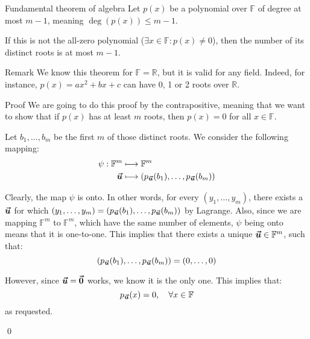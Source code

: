\documentclass[a4paper]{article}
\begin{document}
\begin{parag}{Fundamental theorem of algebra}
    Let $p\left(x\right)$ be a polynomial over $\mathbb{F}$ of degree at most $m-1$, meaning $\deg\left(p\left(x\right)\right) \leq m -1$.

    If this is not the all-zero polynomial ($\exists x \in \mathbb{F} : p\left(x\right) \neq 0$), then the number of its distinct roots is at most $m - 1$. 

    \begin{subparag}{Remark}
        We know this theorem for $\mathbb{F} = \mathbb{R}$, but it is valid for any field. Indeed, for instance, $p\left(x\right) = ax^2 + bx + c$ can have 0, 1 or 2 roots over $\mathbb{R}$.
    \end{subparag}

    \begin{subparag}{Proof}
        We are going to do this proof by the contrapositive, meaning that we want to show that if $p\left(x\right)$ has at least $m$ roots, then $p\left(x\right) = 0$ for all $x \in \mathbb{F}$.

        Let $b_1, \ldots, b_m$ be the first $m$ of those distinct roots. We consider the following mapping:
        \[\begin{split}
        \psi: \mathbb{F}^m &\longmapsto \mathbb{F}^m \\
        \bvec{u} &\longmapsto \left(p_{\bvec{u}}\left(b_1\right), \ldots, p_{\bvec{u}}\left(b_m\right)\right)
        \end{split}\]
        
        Clearly, the map $\psi$ is onto. In other words, for every $\left(y_1, \ldots, y_m\right)$, there exists a $\bm{\protect\vec{u}}$ for which $\left(y_1, \ldots, y_m\right) = \left(p_{\bvec{u}}\left(b_1\right), \ldots, p_{\bvec{u}}\left(b_m\right)\right)$ by Lagrange. Also, since we are mapping $\mathbb{F}^m$ to $\mathbb{F}^m$, which have the same number of elements, $\psi$ being onto means that it is one-to-one. This implies that there exists a unique $\bm{\protect\vec{u}} \in \mathbb{F}^m$, such that: 
        \[\left(p_{\bvec{u}}\left(b_1\right), \ldots, p_{\bvec{u}}\left(b_m\right)\right) = \left(0, \ldots, 0\right)\]
        
        However, since $\bm{\protect\vec{u}} = \bm{\protect\vec{0}}$ works, we know it is the only one. This implies that: 
        \[p_{\bvec{u}}\left(x\right) = 0, \mathspace \forall x \in\mathbb{F}\]
        as requested.

        \qed
    \end{subparag}
\end{parag}
\end{document}
